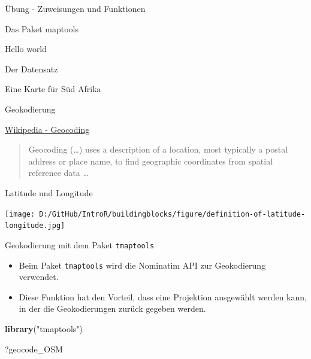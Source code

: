 \documentclass[ignorenonframetext,]{beamer}
\newenvironment{Shaded}{\begin{snugshade}}{\end{snugshade}}
\newcommand{\KeywordTok}[1]{\textcolor[rgb]{0.26,0.66,0.93}{\textbf{#1}}}
\newcommand{\NormalTok}[1]{\textcolor[rgb]{0.74,0.68,0.62}{#1}}
\newcommand{\StringTok}[1]{\textcolor[rgb]{0.02,0.61,0.04}{#1}}
\providecommand{\tightlist}{%
  \setlength{\itemsep}{0pt}\setlength{\parskip}{0pt}}
\begin{document}
\begin{frame}[fragile]{Übung - Zuweisungen und Funktionen}
\begin{frame}[fragile]{Das Paket maptools}
\begin{frame}[fragile]{Hello world}
\begin{frame}[fragile]{Der Datensatz}
\begin{frame}[fragile]{Eine Karte für Süd Afrika}
\begin{frame}{Geokodierung}
\protect\hypertarget{geokodierung-1}{}

\begin{block}{\href{https://github.com/adam-p/markdown-here/wiki/Markdown-Cheatsheet\#blockquotes}{Wikipedia
- Geocoding}}

\begin{quote}
Geocoding (\ldots{}) uses a description of a location, most typically a
postal address or place name, to find geographic coordinates from
spatial reference data \ldots{}
\end{quote}

\end{block}

\end{frame}

\begin{frame}{Latitude und Longitude}
\protect\hypertarget{latitude-und-longitude}{}

\texttt{[image: D:/GitHub/IntroR/buildingblocks/figure/definition-of-latitude-longitude.jpg]}

\end{frame}

\begin{frame}[fragile]{Geokodierung mit dem Paket \texttt{tmaptools}}
\protect\hypertarget{geokodierung-mit-dem-paket-tmaptools}{}

\begin{itemize}
\tightlist
\item
  Beim Paket \texttt{tmaptools} wird die Nominatim API zur Geokodierung
  verwendet.
\item
  Diese Funktion hat den Vorteil, dass eine Projektion ausgewählt werden
  kann, in der die Geokodierungen zurück gegeben werden.
\end{itemize}

\begin{Shaded}
\begin{Highlighting}[]
\KeywordTok{library}\NormalTok{(}\StringTok{"tmaptools"}\NormalTok{)}
\end{Highlighting}
\end{Shaded}

\begin{Shaded}
\begin{Highlighting}[]
\NormalTok{?geocode_OSM}
\end{Highlighting}
\end{Shaded}

\end{frame}


\end{frame}
\end{frame}
\end{frame}
\end{frame}
\end{frame}
\end{document}
